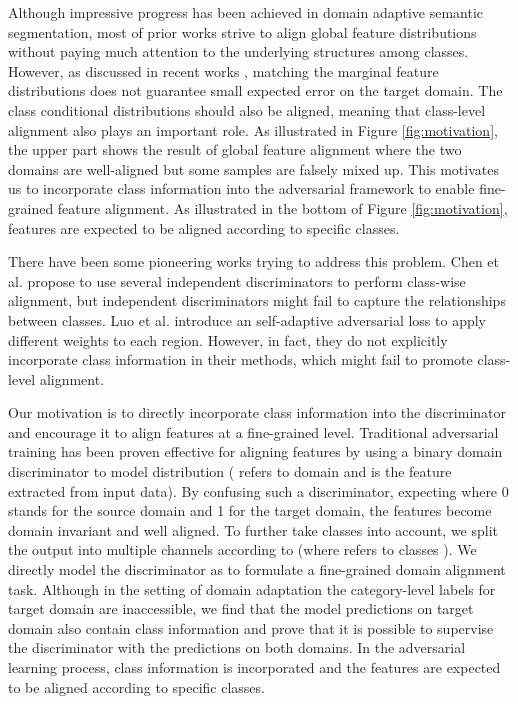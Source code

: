 \documentclass[runningheads]{llncs}
\begin{document}
Although impressive progress has been achieved in domain adaptive semantic segmentation, most of prior works strive to align global feature distributions without paying much attention to the underlying structures among classes. However, as discussed in recent works \cite{NIPS2018_co_regularized, Chen_2019_CVPR}, matching the marginal feature distributions does not guarantee small expected error on the target domain. The class conditional distributions should also be aligned, meaning that class-level alignment also plays an important role. As illustrated in Figure \ref{fig:motivation}, the upper part shows the result of global feature alignment where the two domains are well-aligned but some samples are falsely mixed up. This motivates us to incorporate class information into the adversarial framework to enable fine-grained feature alignment. As illustrated in the bottom of Figure \ref{fig:motivation}, features are expected to 
be aligned according to specific classes.



There have been some pioneering works \cite{Yawei2019Taking,no_more_discrimination} trying to address this problem. Chen et al. \cite{no_more_discrimination} propose to use several independent discriminators to perform class-wise alignment, but independent discriminators might fail to capture the relationships between classes. Luo et al. \cite{Yawei2019Taking} introduce an self-adaptive adversarial loss to apply different weights to each region. However, in fact, they do not explicitly incorporate class information in their methods, which might fail to promote class-level alignment.




Our motivation is to directly incorporate class information into the discriminator and encourage it to align features at a fine-grained level. Traditional adversarial training has been proven effective for aligning features by using a binary domain discriminator to model distribution  ( refers to domain and  is the feature extracted from input data). By confusing such a discriminator, expecting  where 0 stands for the source domain and 1 for the target domain, the features become domain invariant and well aligned. To further take classes into account, we split the output into multiple channels according to  (where  refers to classes ). We directly model the discriminator as  to formulate a fine-grained domain alignment task. Although in the setting of domain adaptation the category-level labels for target domain are inaccessible, we find that the model predictions on target domain also contain class information and prove that it is possible to supervise the discriminator with the predictions on both domains. In the adversarial learning process, class information is incorporated and the features are expected to be aligned according to specific classes.
\end{document}
